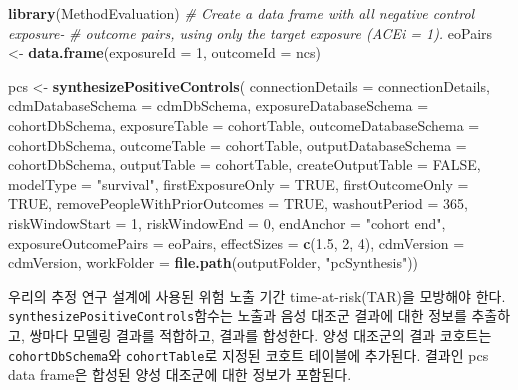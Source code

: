 \documentclass[10.5pt]{book}
\newenvironment{Shaded}{\begin{snugshade}}{\end{snugshade}}
\newcommand{\KeywordTok}[1]{\textcolor[rgb]{0.13,0.29,0.53}{\textbf{#1}}}
\newcommand{\DataTypeTok}[1]{\textcolor[rgb]{0.13,0.29,0.53}{#1}}
\newcommand{\DecValTok}[1]{\textcolor[rgb]{0.00,0.00,0.81}{#1}}
\newcommand{\FloatTok}[1]{\textcolor[rgb]{0.00,0.00,0.81}{#1}}
\newcommand{\StringTok}[1]{\textcolor[rgb]{0.31,0.60,0.02}{#1}}
\newcommand{\CommentTok}[1]{\textcolor[rgb]{0.56,0.35,0.01}{\textit{#1}}}
\newcommand{\OtherTok}[1]{\textcolor[rgb]{0.56,0.35,0.01}{#1}}
\newcommand{\NormalTok}[1]{#1}
\theoremstyle{definition}
\theoremstyle{definition}
\theoremstyle{definition}
\theoremstyle{remark}
\begin{document}
\begin{Shaded}
\begin{Highlighting}[]
\KeywordTok{library}\NormalTok{(MethodEvaluation)}
\CommentTok{# Create a data frame with all negative control exposure-}
\CommentTok{# outcome pairs, using only the target exposure (ACEi = 1).}
\NormalTok{eoPairs <-}\StringTok{ }\KeywordTok{data.frame}\NormalTok{(}\DataTypeTok{exposureId =} \DecValTok{1}\NormalTok{,}
                      \DataTypeTok{outcomeId =}\NormalTok{ ncs)}

\NormalTok{pcs <-}\StringTok{ }\KeywordTok{synthesizePositiveControls}\NormalTok{(}
  \DataTypeTok{connectionDetails =}\NormalTok{ connectionDetails,}
  \DataTypeTok{cdmDatabaseSchema =}\NormalTok{ cdmDbSchema,}
  \DataTypeTok{exposureDatabaseSchema =}\NormalTok{ cohortDbSchema,}
  \DataTypeTok{exposureTable =}\NormalTok{ cohortTable,}
  \DataTypeTok{outcomeDatabaseSchema =}\NormalTok{ cohortDbSchema,}
  \DataTypeTok{outcomeTable =}\NormalTok{ cohortTable,}
  \DataTypeTok{outputDatabaseSchema =}\NormalTok{ cohortDbSchema,}
  \DataTypeTok{outputTable =}\NormalTok{ cohortTable,}
  \DataTypeTok{createOutputTable =} \OtherTok{FALSE}\NormalTok{,}
  \DataTypeTok{modelType =} \StringTok{"survival"}\NormalTok{,}
  \DataTypeTok{firstExposureOnly =} \OtherTok{TRUE}\NormalTok{,}
  \DataTypeTok{firstOutcomeOnly =} \OtherTok{TRUE}\NormalTok{,}
  \DataTypeTok{removePeopleWithPriorOutcomes =} \OtherTok{TRUE}\NormalTok{,}
  \DataTypeTok{washoutPeriod =} \DecValTok{365}\NormalTok{,}
  \DataTypeTok{riskWindowStart =} \DecValTok{1}\NormalTok{,}
  \DataTypeTok{riskWindowEnd =} \DecValTok{0}\NormalTok{,}
  \DataTypeTok{endAnchor =} \StringTok{"cohort end"}\NormalTok{,}
  \DataTypeTok{exposureOutcomePairs =}\NormalTok{ eoPairs,}
  \DataTypeTok{effectSizes =} \KeywordTok{c}\NormalTok{(}\FloatTok{1.5}\NormalTok{, }\DecValTok{2}\NormalTok{, }\DecValTok{4}\NormalTok{),}
  \DataTypeTok{cdmVersion =}\NormalTok{ cdmVersion,}
  \DataTypeTok{workFolder =} \KeywordTok{file.path}\NormalTok{(outputFolder, }\StringTok{"pcSynthesis"}\NormalTok{))}
\end{Highlighting}
\end{Shaded}

우리의 추정 연구 설계에 사용된 위험 노출 기간 time-at-risk(TAR)을
모방해야 한다. \texttt{synthesizePositiveControls}함수는 노출과 음성
대조군 결과에 대한 정보를 추출하고, 쌍마다 모델링 결과를 적합하고,
결과를 합성한다. 양성 대조군의 결과 코호트는 \texttt{cohortDbSchema}와
\texttt{cohortTable}로 지정된 코호트 테이블에 추가된다. 결과인 pcs data
frame은 합성된 양성 대조군에 대한 정보가 포함된다.
\end{document}
